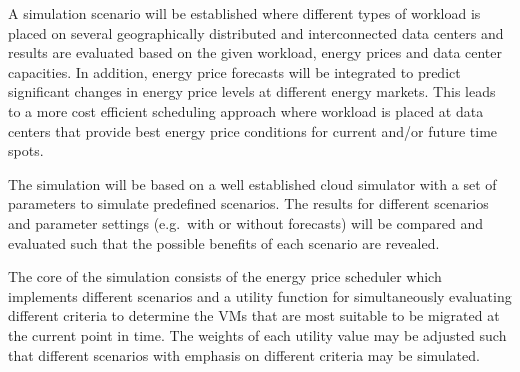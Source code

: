 A simulation scenario will be established where different types of workload is placed on several geographically distributed and interconnected data centers and results are evaluated based on the given workload, energy prices and data center capacities. In addition, energy price forecasts will be integrated to predict significant changes in energy price levels at different energy markets. This leads to a more cost efficient scheduling approach where workload is placed at data centers that provide best energy price conditions for current and/or future time spots. 

The simulation will be based on a well established cloud simulator \cite{lucanin2015philharmonic} with a set of parameters to simulate predefined scenarios. 
The results for different scenarios and parameter settings (e.g.~with or without forecasts) will be compared and evaluated such that the possible benefits of each scenario are revealed. 

The core of the simulation consists of the energy price scheduler which implements different scenarios and a utility function for simultaneously evaluating different criteria to determine the VMs that are most suitable to be migrated at the current point in time. The weights of each utility value may be adjusted such that different scenarios with emphasis on different criteria may be simulated. 





